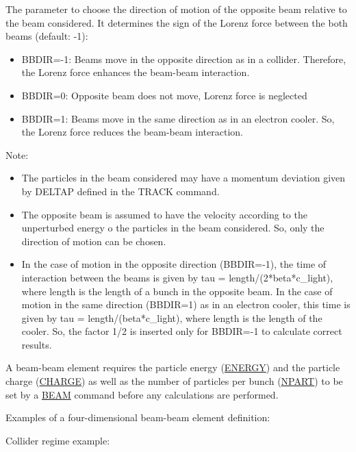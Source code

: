 \begin{madlist}
    The parameter to choose the direction of motion of the 
     opposite beam relative to the beam considered. It determines 
     the sign of the Lorenz force between the both beams (default: -1): 
     \begin{itemize}
        \item  BBDIR=-1: Beams move in the opposite direction as in a collider. 
          Therefore, the Lorenz force enhances the beam-beam interaction. 
	\item  BBDIR=0: Opposite beam does not move, Lorenz force is neglected 
	\item  BBDIR=1: Beams move in the same direction as in an electron cooler. 
          So, the Lorenz force reduces the beam-beam interaction. 
     \end{itemize}
     Note:  
     \begin{itemize}  
        \item  The particles in the beam considered may have a momentum deviation 
          given by DELTAP defined in the TRACK command. 
	\item  The opposite beam is assumed to have the velocity according to the 
          unperturbed energy o the particles in the beam considered. 
          So, only the direction of motion can be chosen. 
	\item  In the case of motion in the opposite direction (BBDIR=-1), 
          the time of interaction between the beams is given by 
          tau = length/(2*beta*c\_light), where length is the length of a bunch in the 
          opposite beam. In the case of motion in the same direction 
          (BBDIR=1) as in an electron cooler, this time 
          is given by tau = length/(beta*c\_light), where length is the length of 
          the cooler. So, the factor 1/2 is inserted only for BBDIR=-1 to calculate 
          correct results. 
     \end{itemize} 
\end{madlist}


A beam-beam element requires the particle energy
(\href{beam.html#energy}{ENERGY})
and the particle charge
(\href{beam.html#charge}{CHARGE})
as well as the number of particles per bunch 
(\href{beam.html#npart}{NPART})
to be set by a \href{beam.html}{BEAM} command
before any calculations are performed.


Examples of a four-dimensional beam-beam element definition:
 
Collider regime example:



